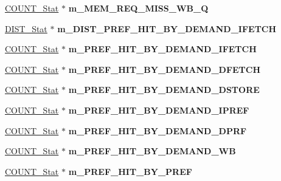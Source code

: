 \begin{DoxyCompactItemize}
\item 
\hypertarget{classall__stats__c_a0a07a269f7c833bc7ac7139bd76c5055}{
\hyperlink{classCOUNT__Stat}{COUNT\_\-Stat} $\ast$ {\bfseries m\_\-MEM\_\-REQ\_\-MISS\_\-WB\_\-Q}}
\label{classall__stats__c_a0a07a269f7c833bc7ac7139bd76c5055}

\item 
\hypertarget{classall__stats__c_aeeb838d5ae50150aa065ebde0ea40aa2}{
\hyperlink{classDIST__Stat}{DIST\_\-Stat} $\ast$ {\bfseries m\_\-DIST\_\-PREF\_\-HIT\_\-BY\_\-DEMAND\_\-IFETCH}}
\label{classall__stats__c_aeeb838d5ae50150aa065ebde0ea40aa2}

\item 
\hypertarget{classall__stats__c_ae102bea1a10e6f42d4c54e9857edc7fb}{
\hyperlink{classCOUNT__Stat}{COUNT\_\-Stat} $\ast$ {\bfseries m\_\-PREF\_\-HIT\_\-BY\_\-DEMAND\_\-IFETCH}}
\label{classall__stats__c_ae102bea1a10e6f42d4c54e9857edc7fb}

\item 
\hypertarget{classall__stats__c_aa8d14aa26809b3d41781d86b49c87f26}{
\hyperlink{classCOUNT__Stat}{COUNT\_\-Stat} $\ast$ {\bfseries m\_\-PREF\_\-HIT\_\-BY\_\-DEMAND\_\-DFETCH}}
\label{classall__stats__c_aa8d14aa26809b3d41781d86b49c87f26}

\item 
\hypertarget{classall__stats__c_af3190cb12e4886c8208b3ee39cf7d3c9}{
\hyperlink{classCOUNT__Stat}{COUNT\_\-Stat} $\ast$ {\bfseries m\_\-PREF\_\-HIT\_\-BY\_\-DEMAND\_\-DSTORE}}
\label{classall__stats__c_af3190cb12e4886c8208b3ee39cf7d3c9}

\item 
\hypertarget{classall__stats__c_a0a9d9030966bcfbde9775ccbd0793a3b}{
\hyperlink{classCOUNT__Stat}{COUNT\_\-Stat} $\ast$ {\bfseries m\_\-PREF\_\-HIT\_\-BY\_\-DEMAND\_\-IPREF}}
\label{classall__stats__c_a0a9d9030966bcfbde9775ccbd0793a3b}

\item 
\hypertarget{classall__stats__c_a59acfc22485732ce79d38caebf57760a}{
\hyperlink{classCOUNT__Stat}{COUNT\_\-Stat} $\ast$ {\bfseries m\_\-PREF\_\-HIT\_\-BY\_\-DEMAND\_\-DPRF}}
\label{classall__stats__c_a59acfc22485732ce79d38caebf57760a}

\item 
\hypertarget{classall__stats__c_a60d34322257d61b798c26ecce52348db}{
\hyperlink{classCOUNT__Stat}{COUNT\_\-Stat} $\ast$ {\bfseries m\_\-PREF\_\-HIT\_\-BY\_\-DEMAND\_\-WB}}
\label{classall__stats__c_a60d34322257d61b798c26ecce52348db}

\item 
\hypertarget{classall__stats__c_abfc23b3d5df843dd33b1af729c29d591}{
\hyperlink{classCOUNT__Stat}{COUNT\_\-Stat} $\ast$ {\bfseries m\_\-PREF\_\-HIT\_\-BY\_\-PREF}}
\label{classall__stats__c_abfc23b3d5df843dd33b1af729c29d591}


\end{DoxyCompactItemize}
